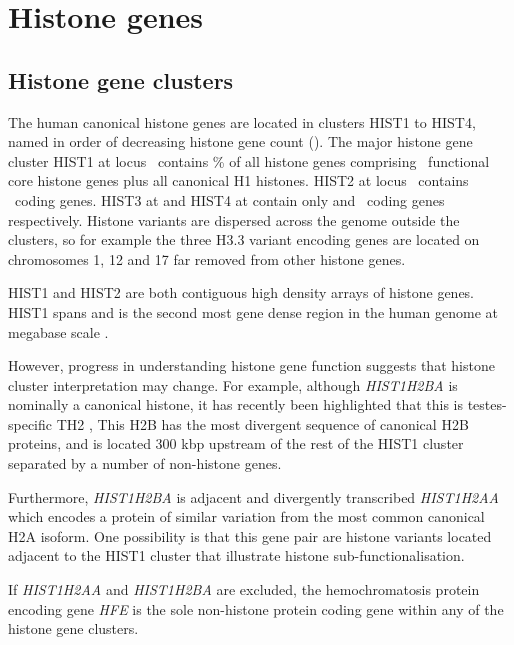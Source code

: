 \section{Histone genes}

  \subsection{Histone gene clusters}
    The human canonical histone genes are located in clusters HIST1 to HIST4, 
	named in order of decreasing histone gene count ().
	The major histone gene cluster HIST1 at locus~\HISTOneLocus{}  
	contains \% of all histone genes 
	comprising \CodingGenesInHISTOne{}~functional core histone genes plus all canonical H1 histones. 
	HIST2 at locus~\HISTTwoLocus{} contains \CodingGenesInHISTTwo{}~coding genes. 
	HIST3 at \HISTThreeLocus{} and HIST4 at \HISTFourLocus{}
	contain only \CodingGenesInHISTThree{} and \CodingGenesInHISTFour{}~coding genes respectively. 
	Histone variants are dispersed across the genome outside the clusters, 
	so for example the three H3.3 variant encoding genes are located on chromosomes 1, 12 and 17 
	far removed from other histone genes.

	HIST1 and HIST2 are both contiguous high density arrays of histone genes. 
	HIST1 spans \HISTOneSpan{} 
	and is the second most gene dense region in the human genome at megabase scale \citep{MHC-III-analysis}.

	However, progress in understanding histone gene function suggests that histone cluster interpretation may change. 
	For example, although \textit{HIST1H2BA} is nominally a canonical histone, 
	it has recently been highlighted that this is testes-specific TH2 , 
	This H2B has the most divergent sequence of canonical H2B proteins, 
	and is located 300 kbp upstream of the rest of the HIST1 cluster 
	separated by a number of non-histone genes. 
	
	Furthermore, \textit{HIST1H2BA} is adjacent and divergently transcribed \textit{HIST1H2AA} 
	which encodes a protein of similar variation from the most common canonical H2A isoform. 
	One possibility is that this gene pair are histone variants 
	located adjacent to the HIST1 cluster that illustrate histone sub-functionalisation.

	If \textit{HIST1H2AA} and \textit{HIST1H2BA} are excluded, 
	the hemochromatosis protein encoding gene \textit{HFE}  
	is the sole non-histone protein coding gene within any of the histone gene clusters. 

